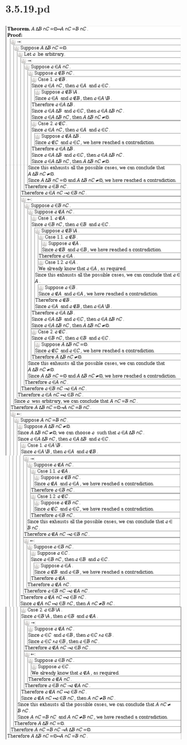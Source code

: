 \documentclass{article}
\begin{document}
\vspace{30pt}

\textbf{3.5.19.pd}
\vspace{10pt}

\includegraphics[scale=0.09]{3_5_19}
\end{document}
